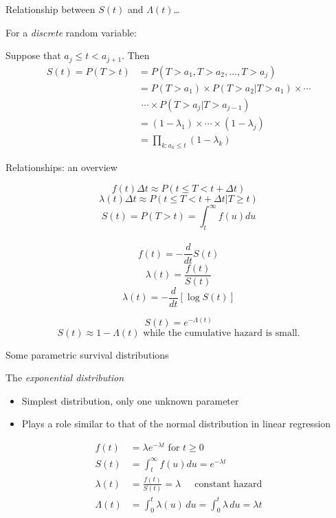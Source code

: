 \documentclass[ignorenonframetext,]{beamer}
\providecommand{\tightlist}{%
  \setlength{\itemsep}{0pt}\setlength{\parskip}{0pt}}
\begin{document}
\begin{frame}{%
\protect\hypertarget{relationship-between-st-and-lambdat-2}{%
Relationship between \(S(t)\) and \(\Lambda(t)\)\ldots}}

For a \emph{discrete} random variable:

Suppose that \(a_j\leq t < a_{j+1}\). Then \begin{align*}
S(t)= P(T>t ) &= P(T > a_1, T > a_2, \ldots, T >  a_{j}) \\
&= P(T >  a_1) \times P(T >  a_2|T > a_1) \times \cdots \\
&\,\, \cdots \times P(T >  a_{j}|T > a_{j-1})\\
&= (1-\lambda_1) \times \cdots \times (1-\lambda_j)\\
&= \prod_{k:a_k \leq t}(1-\lambda_k)
\end{align*}

\end{frame}

\begin{frame}{%
\protect\hypertarget{relationships-an-overview}{%
Relationships: an overview}}

\[  f(t) \Delta t  \approx  P(t \le T < t+\Delta t) \]
\[ \lambda(t) \Delta t \approx  P(t \le T < t+\Delta t | T \ge t) \]
\[   S(t) = P(T>t) = \int_{t}^{\infty} f(u) du \]\\
\[ f(t) =  - \frac{d}{dt} S(t) \] \[ \lambda(t)=\frac{f(t)}{S(t)} \]
\[ \lambda(t)  =  - \frac{d}{dt}  [\log S(t)] \]

\[ S(t) = e^{-\Lambda(t)} \]
\[S(t) \approx 1 -\Lambda(t) \text{ while the cumulative hazard is small.}\]

\end{frame}

\begin{frame}{%
\protect\hypertarget{some-parametric-survival-distributions}{%
Some parametric survival distributions}}

The \emph{exponential distribution}

\begin{itemize}
\tightlist
\item
  Simplest distribution, only one unknown parameter
\item
  Plays a role similar to that of the normal distribution in linear
  regression
\end{itemize}

\begin{align*}
f(t) &= \lambda e^{-\lambda t} \mbox{ for } t\ge 0 \\
S(t) &=  \int_t^\infty f(u) du  =  e^{-\lambda t} \\
\lambda(t) &=  \frac{f(t)}{S(t)}  = 
\lambda ~~~~~\mbox{ constant hazard} \\
\Lambda(t) &=  \int_0^t \lambda(u) \, du  = 
\int_0^t \lambda \, du  = \lambda t  
\end{align*}

\end{frame}
\end{document}
